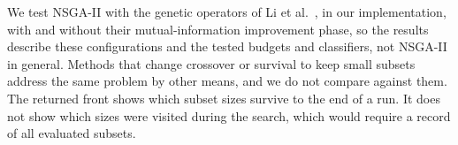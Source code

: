 We test NSGA-II with the genetic operators of Li et al.~\cite{Li2025}, in our implementation, with and without their mutual-information improvement phase, so the results describe these configurations and the tested budgets and classifiers, not NSGA-II in general. Methods that change crossover or survival to keep small subsets~\cite{Xue2022,Wang2026,Tian2020SparseEA,Chu2024,Li2026CORAL} address the same problem by other means, and we do not compare against them. The returned front shows which subset sizes survive to the end of a run. It does not show which sizes were visited during the search, which would require a record of all evaluated subsets.
